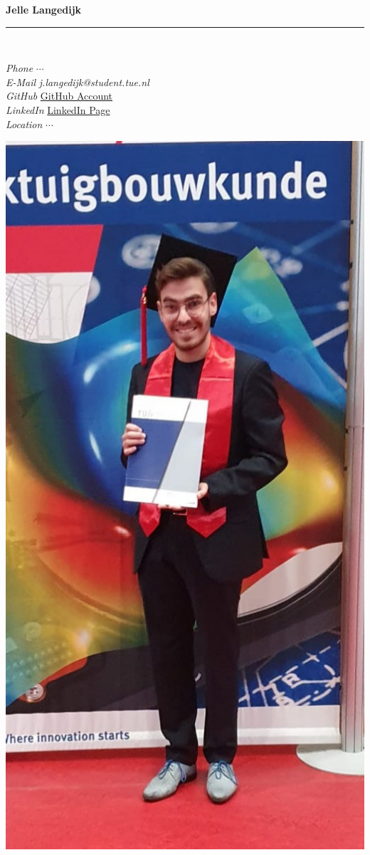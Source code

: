 \documentclass[12pt]{article}
\begin{document}




\textbf{\huge{Jelle Langedijk}}\\
\noindent\hfil\rule{\textwidth}{.4pt}\hfill\\
\vspace{0.5cm}
\begin{minipage}{0.6\textwidth}
\large
{}    \textit{Phone}      \hfill      $\cdots$\\
           \textit{E-Mail}     \hfill      \textit{j.langedijk@student.tue.nl}\\
 \textit{GitHub} \hfill \href{https://github.com/JelleLa}{GitHub Account}\\
      \textit{LinkedIn}   \hfill      \href{https://www.linkedin.com/in/jelle-langedijk-a422281a0/}{LinkedIn Page}\\
 \textit{Location} \hfill $\cdots$
\end{minipage}%
\hspace{1cm}
\begin{minipage}{0.4\textwidth}
\centering
\includegraphics[trim=0 8cm 0 4cm,clip,width=0.5\linewidth]{IMG-20211016-WA0025.jpg}
\end{minipage}
\vspace{0.5cm}
\end{document}
